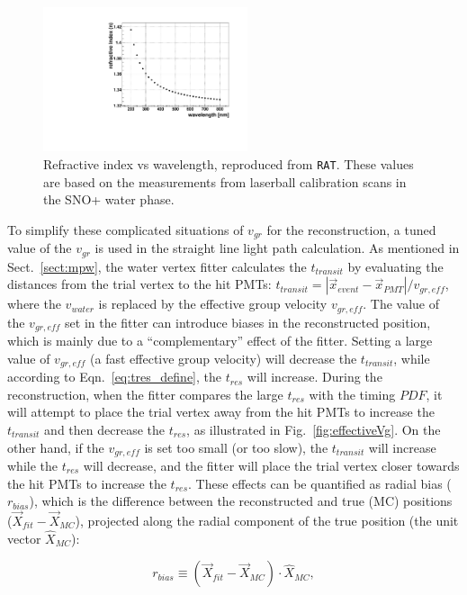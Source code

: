 \begin{figure}[!htb]
	\centering
	\includegraphics[width=6cm]{refractiveIndexVsWavelength.pdf}
	\caption[Refractive index vs wavelength.]{Refractive index vs wavelength, reproduced from \texttt{RAT}. These values are based on the measurements from laserball calibration scans in the SNO+ water phase\cite{laserball_groupVelocity}.}
	\label{nVsWavelength}
\end{figure}

To simplify these complicated situations of $v_{gr}$ for the reconstruction, a tuned value of the $v_{gr}$ is used in the straight line light path calculation. As mentioned in Sect.~\ref{sect:mpw}, the water vertex fitter calculates the $t_{transit}$ by evaluating the distances from the trial vertex to the hit PMTs: $t_{transit}=|\vec{x}_{event}-\vec{x}_{PMT}|/v_{gr,eff}$, where the $v_{water}$ is replaced by the effective group velocity $v_{gr,eff}$. The value of the $v_{gr,eff}$ set in the fitter can introduce biases in the reconstructed position, which is mainly due to a ``complementary'' effect of the fitter. Setting a large value of $v_{gr,eff}$ (a fast effective group velocity) will decrease the $t_{transit}$, while according to Eqn.~\ref{eq:tres_define}, the $t_{res}$ will increase. During the reconstruction, when the fitter compares the large $t_{res}$ with the timing $PDF$, it will attempt to place the trial vertex away from the hit PMTs to increase the $t_{transit}$ and then decrease the $t_{res}$, as illustrated in Fig.~\ref{fig:effectiveVg}. On the other hand, if the $v_{gr,eff}$ is set too small (or too slow), the $t_{transit}$ will increase while the $t_{res}$ will decrease, and the fitter will place the trial vertex closer towards the hit PMTs to increase the $t_{res}$. These effects can be quantified as radial bias ($r_{bias}$), which is the difference between the reconstructed and true (MC) positions ($\vec{X}_{fit}-\vec{X}_{MC}$), projected along the radial component of the true position (the unit vector $\hat{X}_{MC}$)\cite{coulter2013modelling}:

\begin{equation}
r_{bias} \equiv (\vec{X}_{fit}-\vec{X}_{MC})\cdot \hat{X}_{MC},
\end{equation}

